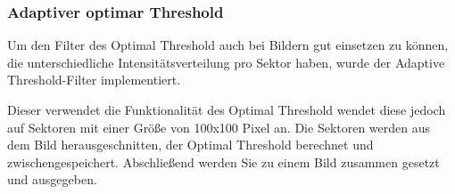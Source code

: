 \documentclass[12pt,german]{article}
\begin{document}



\subsubsection{Adaptiver optimar Threshold}

Um den Filter des Optimal Threshold auch bei Bildern gut einsetzen zu können, die unterschiedliche Intensitätsverteilung pro Sektor haben, wurde der Adaptive Threshold-Filter implementiert.

Dieser verwendet die Funktionalität des Optimal Threshold wendet diese jedoch auf Sektoren mit einer Größe von 100x100 Pixel an. Die Sektoren werden aus dem Bild herausgeschnitten, der Optimal Threshold berechnet und zwischengespeichert. Abschließend werden Sie zu einem Bild zusammen gesetzt und ausgegeben.
\end{document}
